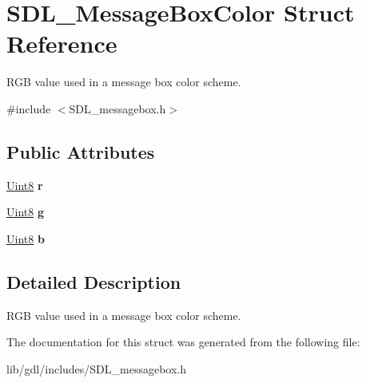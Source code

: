 \hypertarget{struct_s_d_l___message_box_color}{}\section{S\+D\+L\+\_\+\+Message\+Box\+Color Struct Reference}
\label{struct_s_d_l___message_box_color}


R\+G\+B value used in a message box color scheme.  




{\ttfamily \#include $<$S\+D\+L\+\_\+messagebox.\+h$>$}

\subsection*{Public Attributes}
\begin{DoxyCompactItemize}
\item 
\hypertarget{struct_s_d_l___message_box_color_a43ab2172c10058380fcf67ecc3f53184}{}\hyperlink{_s_d_l__stdinc_8h_a2944638813a090aa23e62f4da842c3e2}{Uint8} {\bfseries r}\label{struct_s_d_l___message_box_color_a43ab2172c10058380fcf67ecc3f53184}

\item 
\hypertarget{struct_s_d_l___message_box_color_a5820adab0b32aa3eade101ea36ed6b4a}{}\hyperlink{_s_d_l__stdinc_8h_a2944638813a090aa23e62f4da842c3e2}{Uint8} {\bfseries g}\label{struct_s_d_l___message_box_color_a5820adab0b32aa3eade101ea36ed6b4a}

\item 
\hypertarget{struct_s_d_l___message_box_color_ad1215a42167cb5b190ff8f19dbd42066}{}\hyperlink{_s_d_l__stdinc_8h_a2944638813a090aa23e62f4da842c3e2}{Uint8} {\bfseries b}\label{struct_s_d_l___message_box_color_ad1215a42167cb5b190ff8f19dbd42066}

\end{DoxyCompactItemize}


\subsection{Detailed Description}
R\+G\+B value used in a message box color scheme. 

The documentation for this struct was generated from the following file\+:\begin{DoxyCompactItemize}
\item 
lib/gdl/includes/S\+D\+L\+\_\+messagebox.\+h\end{DoxyCompactItemize}
